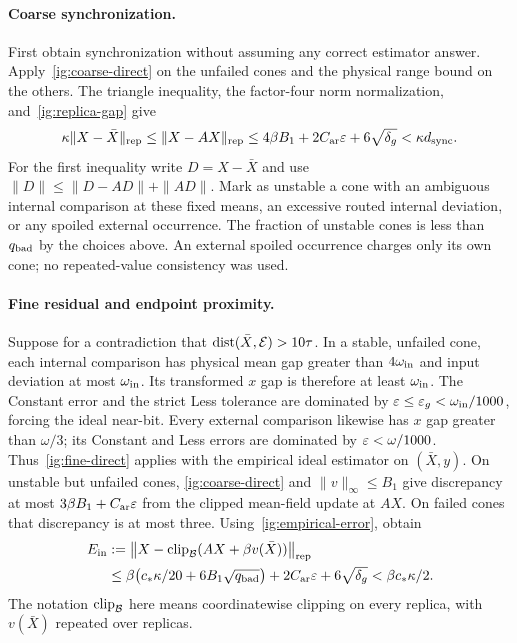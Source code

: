 \paragraph{Coarse synchronization.}
First obtain synchronization without assuming any correct estimator
answer. Apply~\eqref{ig:coarse-direct} on the unfailed cones and the
physical range bound on the others. The triangle inequality, the
factor-four norm normalization, and~\eqref{ig:replica-gap} give
\begin{equation}\label{ig:coarse-sync}
 \kappa\|X-\bar X\|_{\rm rep}
 \le\|X-AX\|_{\rm rep}
 \le4\beta B_1+2C_{\rm ar}\varepsilon+6\sqrt{\delta_g}
 <\kappa d_{\rm sync}.
\end{equation}
For the first inequality write $D=X-\bar X$ and use
$\|D\|\le\|D-AD\|+\|AD\|$. Mark as unstable a cone with an
ambiguous internal comparison at these fixed means, an excessive routed
internal deviation, or any spoiled external occurrence. The fraction of
unstable cones is less than $q_{\rm bad}$ by the choices above. An
external spoiled occurrence charges only its own cone; no repeated-value
consistency was used.

\paragraph{Fine residual and endpoint proximity.}
Suppose for a contradiction that
$\operatorname{dist}(\bar X,\mathcal E)>10\tau$. In a stable, unfailed cone,
each internal comparison has physical mean gap greater than
$4\omega_{\rm in}$ and input deviation at most $\omega_{\rm in}$.
Its transformed $x$ gap is therefore at least $\omega_{\rm in}$.
The Constant error and the strict Less tolerance are dominated by
$\varepsilon\le\varepsilon_g<\omega_{\rm in}/1000$, forcing the ideal near-bit.
Every external comparison likewise has $x$ gap greater than $\omega/3$;
its Constant and Less errors are dominated by $\varepsilon<\omega/1000$.
Thus~\eqref{ig:fine-direct} applies with the empirical ideal estimator
on $(\bar X,y)$. On unstable but unfailed cones,
\eqref{ig:coarse-direct} and $\|v\|_\infty\le B_1$ give discrepancy
at most $3\beta B_1+C_{\rm ar}\varepsilon$ from the clipped mean-field
update at $AX$. On failed cones that discrepancy is at most three.
Using~\eqref{ig:empirical-error}, obtain
\begin{align}
 E_{\rm in}
 &:=\bigl\|X-\operatorname{clip}_{\mathcal B}
              (AX+\beta v(\bar X))\bigr\|_{\rm rep}\notag\\
 &\le\beta\bigl(c_*\kappa/20+6B_1\sqrt{q_{\rm bad}}\bigr)
       +2C_{\rm ar}\varepsilon+6\sqrt{\delta_g}
 <\beta c_*\kappa/2.
 \label{ig:refined-error}
\end{align}
The notation $\operatorname{clip}_{\mathcal B}$ here means coordinatewise clipping
on every replica, with $v(\bar X)$ repeated over replicas.

